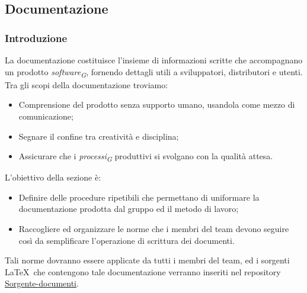 \subsection{Documentazione}

\subsubsection{Introduzione}
La documentazione costituisce l'insieme di informazioni scritte che accompagnano un prodotto \textit{software}\textsubscript{\textit{G}}, fornendo dettagli utili a sviluppatori, distributori e utenti.\\
Tra gli scopi della documentazione troviamo:
\begin{itemize}
    \item Comprensione del prodotto senza supporto umano, usandola come mezzo di comunicazione;
    \item Segnare il confine tra creatività e disciplina;
    \item Assicurare che i \textit{processi}\textsubscript{\textit{G}} produttivi si svolgano con la qualità attesa.
\end{itemize}

L'obiettivo della sezione è:
\begin{itemize}
    \item  Definire delle procedure ripetibili che permettano di uniformare la documentazione prodotta dal gruppo ed il metodo di lavoro;
    \item  Raccogliere ed organizzare le norme che i membri del team devono seguire così da semplificare l'operazione di scrittura dei documenti.
\end{itemize}
Tali norme dovranno essere applicate da tutti i membri del team, ed i sorgenti \LaTeX\ che contengono tale documentazione verranno inseriti nel repository \href{https://github.com/ByteOps-swe/Sorgente-documenti}{Sorgente-documenti}.

\begin{comment} \paragraph*{Primi approcci alla redazione di documenti e problematiche riscontrate}
Per la composizione iniziale dei documenti richiesti per la candidatura, è stato sperimentato un'approccio che impiegava gli strumenti di Google Drive. Tale metodologia consentiva ai redattori di redigere agevolmente i documenti senza la necessità di padroneggiare la sintassi LaTeX, con l'intenzione di trasporre successivamente il contenuto in LaTeX una volta che fosse stato validato dai verificatori. Tuttavia, questo approccio ha suscitato problematiche, tra cui:
\begin{itemize}
    \item Rischio di incoerenza tra il contenuto presente negli strumenti di Google Drive.
    \item Prolungato impiego di tempo per la riscrittura in LaTeX, dovuto alla necessità di un passaggio aggiuntivo.
\end{itemize}
Per tali ragioni si è presa la decisione di adottare un nuovo approccio.
\end{comment}
